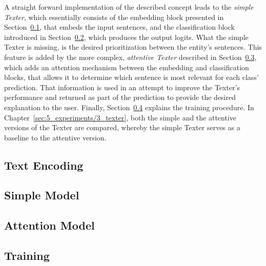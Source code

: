 A straight forward implementation of the described concept leads to the \emph{simple Texter}, which essentially consists of the embedding block presented in Section~\ref{subsec:4_approach/1_texter/1_text_embedding}, that embeds the input sentences, and the classification block introduced in Section~\ref{subsec:4_approach/1_texter/2_simple_model}, which produces the output logits. What the simple Texter is missing, is the desired prioritization between the entity's sentences. This feature is added by the more complex, \emph{attentive Texter} described in Section~\ref{subsec:4_approach/1_texter/3_attention_model}, which adds an attention mechanism between the embedding and classification blocks, that allows it to determine which sentence is most relevant for each class' prediction. That information is used in an attempt to improve the Texter's performance and returned as part of the prediction to provide the desired explanation to the user. Finally, Section~\ref{subsec:4_approach/1_texter/4_training} explains the training procedure. In Chapter~\ref{sec:5_experiments/3_texter}, both the simple and the attentive versions of the Texter are compared, whereby the simple Texter serves as a baseline to the attentive version.

\subsection{Text Encoding}
\label{subsec:4_approach/1_texter/1_text_embedding}


\subsection{Simple Model}
\label{subsec:4_approach/1_texter/2_simple_model}


\subsection{Attention Model}
\label{subsec:4_approach/1_texter/3_attention_model}


\subsection{Training}
\label{subsec:4_approach/1_texter/4_training}


